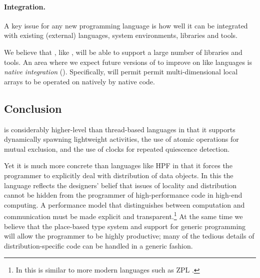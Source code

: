 \paragraph{Integration.}
A key issue for any new programming language is how well it can be
integrated with existing (external) languages, system environments,
libraries and tools.

We believe that \Xten{}, like \java{}, will be able to support a large
number of libraries and tools. An area where we expect future versions
of \Xten{} to improve on \java{} like languages is \emph{native
integration} (). Specifically, \Xten{} will permit
permit multi-dimensional local arrays to be operated on natively by
native code.

\subsection{Conclusion}
{}\Xten{} is considerably higher-level than thread-based languages in
that it supports dynamically spawning lightweight activities, the
use of atomic operations for mutual exclusion, and the use of clocks
for repeated quiescence detection.

Yet it is much more concrete than languages like HPF in that it forces
the programmer to explicitly deal with distribution of data
objects. In this the language reflects the designers' belief that
issues of locality and distribution cannot be hidden from the
programmer of high-performance code in high-end computing.  A
performance model that distinguishes between computation and
communication must be made explicit and transparent.\footnote{In this
\Xten{} is similar to more modern languages such as ZPL \cite{zpl}.}
At the same time we believe that the place-based type system and
support for generic programming will allow the \Xten{} programmer to
be highly productive; many of the tedious details of
distribution-specific code can be handled in a generic fashion.
